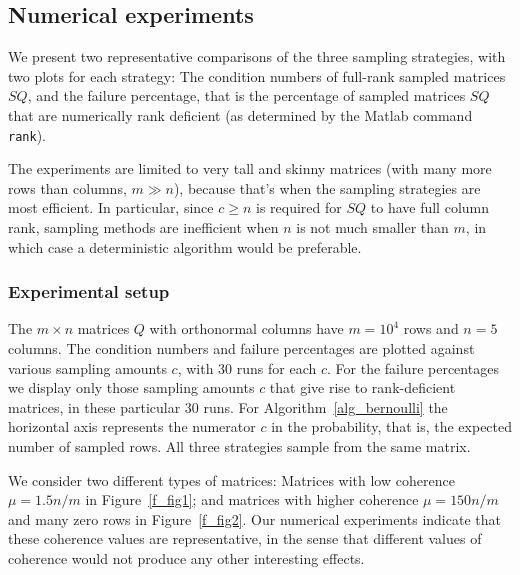 \documentclass{siamltex}
\begin{document}
\subsection{Numerical experiments}\label{s_sampcomp}
We present two representative comparisons of the three sampling
strategies, with two plots for each strategy: The condition numbers of
full-rank sampled matrices $SQ$, and the failure percentage, that is
the percentage of sampled matrices $SQ$ that are numerically rank
deficient (as determined by the Matlab command \texttt{rank}).

The experiments are limited to very tall and skinny matrices
(with many more rows than columns, $m\gg n$), because
that's when the sampling strategies are most efficient. In particular,
since $c\geq n$ is required for $SQ$ to have full column rank,
sampling methods are inefficient when $n$ is not much smaller than
$m$, in which case a deterministic algorithm would be preferable.

\subsubsection*{Experimental setup}
The $m\times n$ matrices $Q$ with orthonormal columns have $m=10^4$ 
rows and $n=5$ columns. The condition numbers and failure percentages
are plotted against various sampling amounts $c$, with 30 runs for each $c$. 
For the failure percentages we display
only those sampling amounts $c$ that give rise to rank-deficient
matrices, in these particular 30 runs.
For Algorithm~\ref{alg_bernoulli} the horizontal
axis represents the numerator $c$ in the probability, that is, the expected 
number of sampled rows.
All three strategies sample from the same matrix.

We consider two different types of matrices:
Matrices with low coherence $\mu=1.5n/m$ in Figure~\ref{f_fig1}; and 
matrices with higher coherence $\mu=150n/m$ and many zero rows
in Figure~\ref{f_fig2}. Our numerical experiments indicate that these 
coherence values are representative, in the sense that different values 
of coherence would not produce any other interesting effects.
\end{document}
